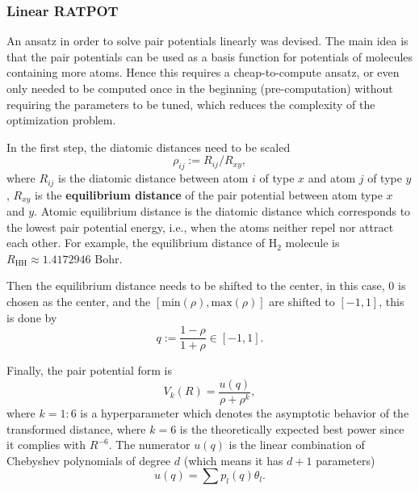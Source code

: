 \documentclass[12pt]{article}
\begin{document}
\subsubsection{Linear RATPOT}
An ansatz in order to solve pair potentials linearly was devised. The main idea is that the pair potentials can be used as a basis function for potentials of molecules containing more atoms. Hence this requires a cheap-to-compute ansatz, or even only needed to be computed once in the beginning (pre-computation) without requiring the parameters to be tuned, which reduces the complexity of the optimization problem. 

In the first step, the diatomic distances need to be scaled
\begin{equation}
    \rho_{ij} := R_{ij}/R_{xy},
    \label{eq:rho_distance}
\end{equation}
where $R_{ij}$ is the diatomic distance between atom $i$ of type $x$ and atom $j$ of type $y$, $R_{xy}$ is the \textbf{equilibrium distance} of the pair potential between atom type $x$ and $y$. Atomic equilibrium distance is the diatomic distance which corresponds to the lowest pair potential energy, i.e., when the atoms neither repel nor attract each other. For example, the equilibrium distance of H$_2$ molecule is $R_\text{HH} \approx 1.4172946$ Bohr. 

Then the equilibrium distance needs to be shifted to the center, in this case, 0 is chosen as the center, and the $[\text{min}(\rho), \text{max}(\rho)]$ are shifted to $[-1,1]$, this is done by
\begin{equation}
    q := \frac{1-\rho}{1+\rho} \in [-1, 1].
    \label{eq:q_distance}
\end{equation}

Finally, the pair potential form is
\begin{equation}
    V_k(R) = \frac{u(q)}{\rho + \rho^k},
    \label{eq:linear_RATPOT}
\end{equation}
where $k=1:6$ is a hyperparameter which denotes the asymptotic behavior of the transformed distance, where $k=6$ is the theoretically expected best power since it complies with $R^{-6}$. The numerator $u(q)$ is the linear combination of Chebyshev polynomials of degree $d$ (which means it has $d+1$ parameters)
\begin{equation}
    u(q) = \sum p_l(q) \theta_l.
    \label{eq:chebyshev_pol}
\end{equation}
\end{document}
